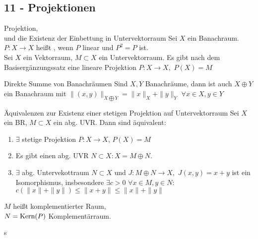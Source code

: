 \subsection*{11 - Projektionen}

	\begin{karte}{Projektion, \\ und die Existenz der Einbettung in Untervektorraum}
	Sei $X$ ein Banachraum. $P \colon X \rightarrow X$ hei{\ss}t , wenn $P$ linear und $P^{2} = P$ ist. \\


	Sei $X$ ein Vektorraum, $M \subset X$ ein Untervektorraum. Es gibt nach dem Basisergänzungssatz eine lineare Projektion $P \colon X \rightarrow X,$ $P(X) = M$	
	\end{karte}

	\begin{karte}{Direkte Summe von Banachräumen}
	Sind $X, Y$ Banachräume, dann ist auch $X \oplus Y$ ein Banachraum mit $\| (x, y) \|_{X \bigoplus Y} = \| x \|_{X} + \| y \|_{Y}$ $\forall x \in X, y \in Y$
	\end{karte}

	\begin{karte}{Äquivalenzen zur Existenz einer stetigen Projektion auf Untervektorraum}
	Sei $X$ ein BR, $M \subset X$ ein abg. UVR. Dann sind äquivalent:
	\begin{enumerate}[label=\alph*\upshape)]
		\item $\exists$ stetige Projektion $P \colon X \rightarrow X$, $P(X) = M$
		\item Es gibt einen abg. UVR $N \subset X: X = M \oplus N$.
		\item $\exists$ abg. Untervekottraum $N \subset X$ und $J: M \oplus N \rightarrow X,$ $J(x, y) = x + y$ ist ein Isomorphismus, insbesondere $\exists c > 0$ $\forall x \in M, y \in N:$ $c \left( \|x \| + \|y \| \right) \leq \|x + y \| \leq \|x \| + \| y \| $
	\end{enumerate}
	$M$ hei{\ss}t komplementierter Raum, \\
	$N = \mathop{\rm Kern}\nolimits(P)$ Komplementärraum.
	\end{karte}s